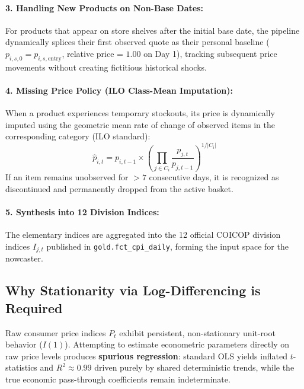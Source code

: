 \documentclass[a4paper, 11pt]{article}
\begin{document}
\paragraph{3. Handling New Products on Non-Base Dates:}
For products that appear on store shelves after the initial base date, the pipeline dynamically splices their first observed quote as their personal baseline ($p_{i, s, 0} = p_{i, s, \text{entry}}$, relative price = $1.00$ on Day 1), tracking subsequent price movements without creating fictitious historical shocks.

\paragraph{4. Missing Price Policy (ILO Class-Mean Imputation):}
When a product experiences temporary stockouts, its price is dynamically imputed using the geometric mean rate of change of observed items in the corresponding category (ILO standard):
\begin{equation}
    \hat{p}_{i, t} = p_{i, t-1} \times \left( \prod_{j \in C_i} \frac{p_{j, t}}{p_{j, t-1}} \right)^{1/|C_i|}
\end{equation}
If an item remains unobserved for $>7$ consecutive days, it is recognized as discontinued and permanently dropped from the active basket.

\paragraph{5. Synthesis into 12 Division Indices:}
The elementary indices are aggregated into the 12 official COICOP division indices $I_{j, t}$ published in \texttt{gold.fct\_cpi\_daily}, forming the input space for the nowcaster.

\subsection{Why Stationarity via Log-Differencing is Required}
Raw consumer price indices $P_t$ exhibit persistent, non-stationary unit-root behavior ($I(1)$). Attempting to estimate econometric parameters directly on raw price levels produces \textbf{spurious regression}: standard OLS yields inflated $t$-statistics and $R^2 \approx 0.99$ driven purely by shared deterministic trends, while the true economic pass-through coefficients remain indeterminate.
\end{document}
